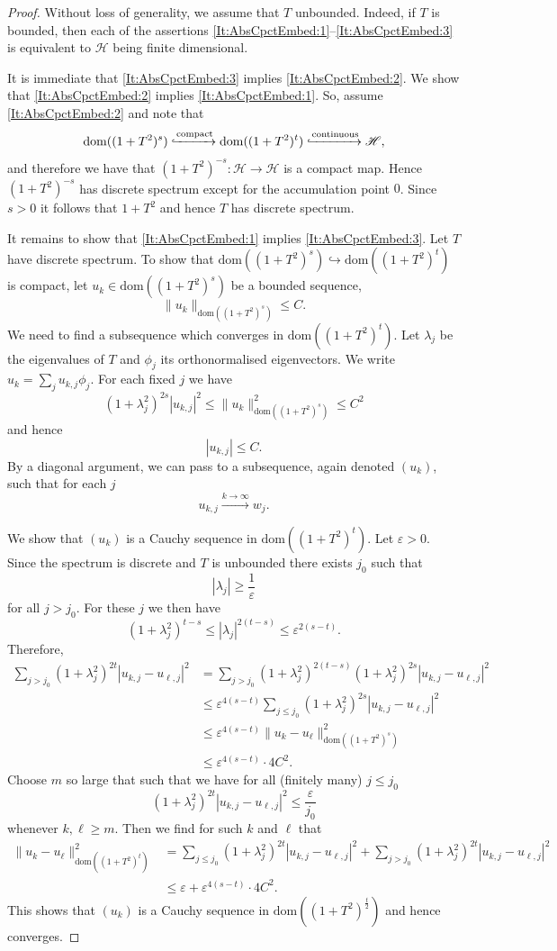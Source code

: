 \documentclass[10pt,a4paper]{amsart}
\newcommand{\Hil}{\mathscr{H}}
\newcommand{\dom}{\mathrm{dom}}
\newcommand{\embed}{\hookrightarrow}%
\renewcommand{\epsilon}{\varepsilon}
\begin{document}
\begin{proof}
Without loss of generality, we assume that $T$ unbounded.
Indeed, if $T$ is bounded, then each of the assertions \ref{It:AbsCpctEmbed:1}--\ref{It:AbsCpctEmbed:3} is equivalent to $\Hil$ being finite dimensional.

It is immediate that \ref{It:AbsCpctEmbed:3} implies \ref{It:AbsCpctEmbed:2}.
We show that \ref{It:AbsCpctEmbed:2} implies \ref{It:AbsCpctEmbed:1}.
So, assume \ref{It:AbsCpctEmbed:2} and note that 
$$ 
\dom((1+T^2)^s) \xhookrightarrow{\mathrm{compact}} \dom((1+T^2)^t) \xhookrightarrow{\mathrm{continuous}} \Hil,
$$
and therefore we have that $(1+T^2)^{-s}:\Hil \to \Hil$ is a compact map.
Hence $(1+T^2)^{-s}$ has discrete spectrum except for the accumulation point $0$.
Since $s>0$ it follows that $1+T^2$ and hence $T$ has discrete spectrum.

It remains to show that \ref{It:AbsCpctEmbed:1} implies \ref{It:AbsCpctEmbed:3}.
Let $T$ have discrete spectrum.
To show that $\dom((1+T^2)^s) \embed \dom((1+T^2)^t)$ is compact, let $u_k\in \dom((1+T^2)^s)$ be a bounded sequence, 
$$
\|u_k\|_{\dom((1 +T^2)^s)} \leq C.
$$
We need to find a subsequence which converges in $\dom((1 +T^2)^t)$.
Let $\lambda_j$ be the eigenvalues of $T$ and $\phi_j$ its orthonormalised eigenvectors.
We write $u_k = \sum_j u_{k,j}\phi_j$.
For each fixed $j$ we have
$$
(1+\lambda_j^2)^{2s} |u_{k,j}|^2 \le \|u_k\|_{\dom((1 +T^2)^s)}^2 \le C^2
$$
and hence 
$$
|u_{k,j}| \le C .
$$
By a diagonal argument, we can pass to a subsequence, again denoted $(u_k)$, such that for each $j$
$$
u_{k,j} \xrightarrow{k\to\infty} w_j .
$$

We show that $(u_k)$ is a Cauchy sequence in $\dom((1 +T^2)^t)$.
Let $\epsilon>0$.
Since the spectrum is discrete and $T$ is unbounded there exists $j_0$ such that 
$$
|\lambda_j| \ge \frac1\epsilon 
$$
for all $j> j_0$.
For these $j$ we then have
$$
(1+\lambda_j^2)^{t-s}
\le 
|\lambda_j|^{2(t-s)}
\le
\epsilon^{2(s-t)}.
$$
Therefore,
\begin{align*}
\sum_{j> j_0} (1+\lambda_j^2)^{2t} |u_{k,j}-u_{\ell,j}|^2
&=
\sum_{j> j_0} (1+\lambda_j^2)^{2(t-s)}(1+\lambda_j^2)^{2s} |u_{k,j}-u_{\ell,j}|^2 \\
&\le
\epsilon^{4(s-t)}\sum_{j\le j_0}(1+\lambda_j^2)^{2s} |u_{k,j}-u_{\ell,j}|^2 \\
&\le
\epsilon^{4(s-t)} \|u_k-u_\ell\|_{\dom((1 +T^2)^s)}^2 \\
&\le
\epsilon^{4(s-t)} \cdot 4C^2.
\end{align*}
Choose $m$ so large that such that we have for all (finitely many) $j\le j_0$
$$
(1+\lambda_j^2)^{2t} |u_{k,j}-u_{\ell,j}|^2 \le \frac{\epsilon}{j_0}
$$
whenever $k,\ell\ge m$.
Then we find for such $k$ and $\ell$ that
\begin{align*}
\|u_k-u_\ell\|_{\dom((1 +T^2)^t)}^2
&=
\sum_{j\le j_0}(1+\lambda_j^2)^{2t} |u_{k,j}-u_{\ell,j}|^2
+ \sum_{j> j_0}(1+\lambda_j^2)^{2t} |u_{k,j}-u_{\ell,j}|^2 \\
&\le
\epsilon + \epsilon^{4(s-t)} \cdot 4C^2.
\end{align*}
This shows that $(u_k)$ is a Cauchy sequence in $\dom((1 +T^2)^{\frac t 2})$ and hence converges.
\end{proof} 
\end{document}
